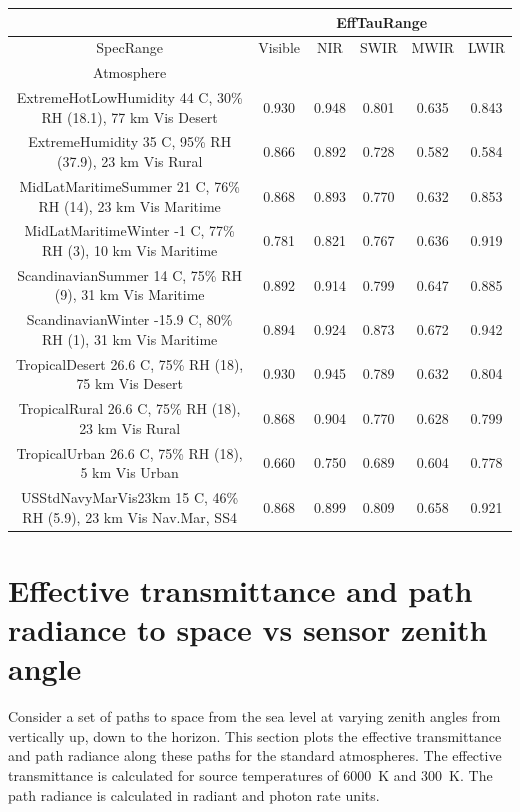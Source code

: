 \documentclass{workpackage}
\begin{document}
\begin{center}

\begin{footnotesize}

\begin{tabular}{|c|c|c|c|c|c|}
\hline
&\multicolumn{5}{|c|}{EffTauRange}\\\hline
SpecRange&Visible&NIR&SWIR&MWIR&LWIR\\\hline
Atmosphere&&&&&\\\hline
ExtremeHotLowHumidity 44 C, 30\% RH (18.1), 77 km Vis Desert&0.930&0.948&0.801&0.635&0.843\\\hline
ExtremeHumidity 35 C, 95\% RH (37.9), 23 km Vis Rural&0.866&0.892&0.728&0.582&0.584\\\hline
MidLatMaritimeSummer 21 C, 76\% RH (14), 23 km Vis Maritime&0.868&0.893&0.770&0.632&0.853\\\hline
MidLatMaritimeWinter -1 C, 77\% RH (3), 10 km Vis Maritime&0.781&0.821&0.767&0.636&0.919\\\hline
ScandinavianSummer 14 C, 75\% RH (9), 31 km Vis Maritime&0.892&0.914&0.799&0.647&0.885\\\hline
ScandinavianWinter -15.9 C, 80\% RH (1), 31 km Vis Maritime&0.894&0.924&0.873&0.672&0.942\\\hline
TropicalDesert 26.6 C, 75\% RH (18), 75 km Vis Desert&0.930&0.945&0.789&0.632&0.804\\\hline
TropicalRural 26.6 C, 75\% RH (18), 23 km Vis Rural&0.868&0.904&0.770&0.628&0.799\\\hline
TropicalUrban 26.6 C, 75\% RH (18), 5 km Vis Urban&0.660&0.750&0.689&0.604&0.778\\\hline
USStdNavyMarVis23km 15 C, 46\% RH (5.9), 23 km Vis Nav.Mar, SS4&0.868&0.899&0.809&0.658&0.921\\\hline

\end{tabular}
\end{footnotesize}
\end{center}



\section{Effective transmittance and path radiance to space vs sensor zenith angle}
\label{sec:Effectivetransmittanceandpathradiancetospacevssensorzenithangle}

Consider a set of paths to space from the sea level at varying zenith angles from vertically up, down to the horizon.  This section plots the effective transmittance and path radiance along these paths for the standard atmospheres.  The effective transmittance is calculated for source temperatures of 6000~K and 300~K.  The path radiance is calculated in radiant and photon rate units.
\end{document}
